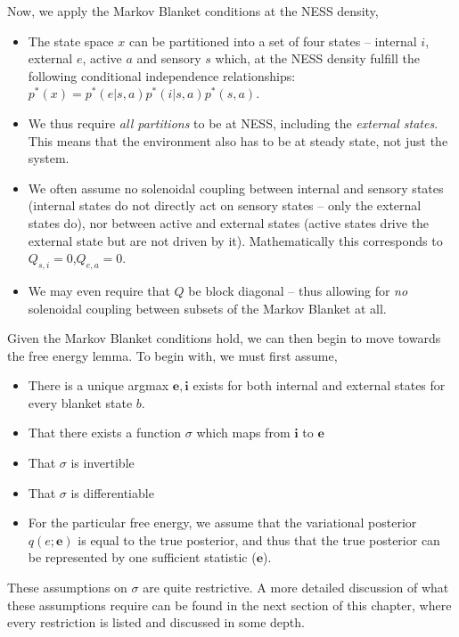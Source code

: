 Now, we apply the Markov Blanket conditions at the NESS density,
\begin{itemize}
    \item The state space $x$ can be partitioned into a set of four states -- internal $i$, external $e$, active $a$ and sensory $s$ which, at the NESS density fulfill the following conditional independence relationships:
    $p^*(x) = p^*(e | s,a)p^*(i | s,a)p^*(s,a)$.
    \item We thus require \emph{all partitions} to be at NESS, including the \emph{external states}. This means that the environment also has to be at steady state, not just the system.
    \item We often assume no solenoidal coupling between internal and sensory states (internal states do not directly act on sensory states -- only the external states do), nor between active and external states (active states drive the external state but are not driven by it). Mathematically this corresponds to $Q_{s,i} = 0$,$Q_{e,a} = 0$. 
    \item We may even require that $Q$ be block diagonal -- thus allowing for \emph{no} solenoidal coupling between subsets of the Markov Blanket at all.
\end{itemize}
Given the Markov Blanket conditions hold, we can then begin to move towards the free energy lemma. To begin with, we must first assume,
\begin{itemize}
    \item There is a unique argmax $\boldsymbol{e}, \boldsymbol{i}$ exists for both internal and external states for every blanket state $b$.
    \item That there exists a function $\sigma$ which maps from $\boldsymbol{i}$ to $\boldsymbol{e}$
    \item That $\sigma$ is invertible
    \item That $\sigma$ is differentiable    
    \item For the particular free energy, we assume that the variational posterior $q(e ; \boldsymbol{e})$ is equal to the true posterior, and thus that the true posterior can be represented by one sufficient statistic ($\boldsymbol{e}$).
\end{itemize}
These assumptions on $\sigma$ are quite restrictive. A more detailed discussion of what these assumptions require can be found in the next section of this chapter, where every restriction is listed and discussed in some depth.

